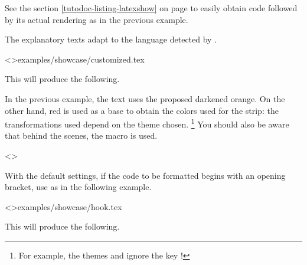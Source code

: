 



\smallskip

\begin{tdocrem}
    See the section \ref{tutodoc-listing-latexshow} on page \pageref{tutodoc-listing-latexshow} to easily obtain code followed by its actual rendering as in the previous example.
\end{tdocrem}


\begin{tdocnote}
    The explanatory texts adapt to the language detected by \thisproj.
\end{tdocnote}




\begin{tdocexa}
    \leavevmode

    \tdoclatexinput<>{examples/showcase/customized.tex}

    This will produce the following.

    \medskip

    

\end{tdocexa}


\begin{tdocnote}
    In the previous example, the text uses the proposed darkened orange. On the other hand, red is used as a base to obtain the colors used for the strip: the transformations used depend on the theme chosen.%
    \footnote{
        For example, the themes  and  ignore the key !
    }
    You should also be aware that behind the scenes, the macro  is used.

    \begin{tdoclatex}<>
    \end{tdoclatex}
\end{tdocnote}




\begin{tdocwarn}
    With the default settings, if the code to be formatted begins with an opening bracket, use  as in the following example.

    \tdoclatexinput<>{examples/showcase/hook.tex}

    This will produce the following.
\end{tdocwarn}



